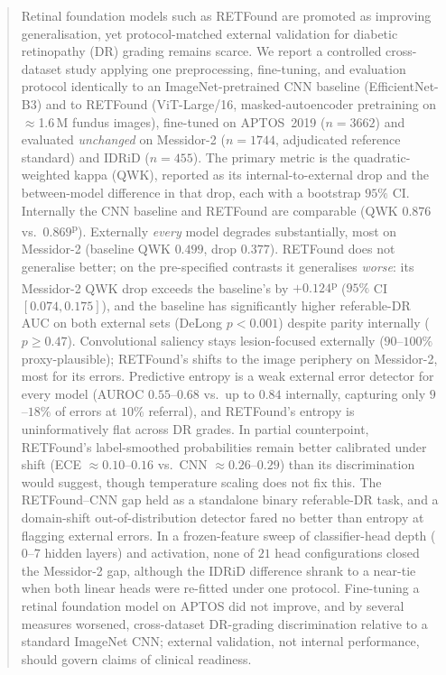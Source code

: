 \documentclass[journal]{IEEEtran}
\newcommand{\pv}[1]{#1\textsuperscript{p}}
\begin{document}
\begin{abstract}
Retinal foundation models such as RETFound are promoted as improving
generalisation, yet protocol-matched external validation for diabetic
retinopathy (DR) grading remains scarce. We report a controlled cross-dataset
study applying one preprocessing, fine-tuning, and evaluation protocol
identically to an ImageNet-pretrained CNN baseline (EfficientNet-B3) and to
RETFound (ViT-Large/16, masked-autoencoder pretraining on $\approx$1.6\,M
fundus images), fine-tuned on APTOS~2019 ($n=3662$) and evaluated
\emph{unchanged} on Messidor-2 ($n=1744$, adjudicated reference standard) and
IDRiD ($n=455$). The primary metric is the quadratic-weighted kappa (QWK),
reported as its internal-to-external drop and the between-model difference in
that drop, each with a bootstrap $95\%$ CI. Internally the CNN baseline and
RETFound are comparable (QWK $0.876$ vs.\ \pv{$0.869$}). Externally
\emph{every} model degrades substantially, most on Messidor-2 (baseline QWK
$0.499$, drop $0.377$). RETFound does not generalise better; on the
pre-specified contrasts it generalises \emph{worse}: its Messidor-2 QWK drop
exceeds the baseline's by \pv{$+0.124$} ($95\%$ CI $[0.074,0.175]$), and the
baseline has significantly higher referable-DR AUC on both external sets
(DeLong $p<0.001$) despite parity internally ($p\geq0.47$). Convolutional
saliency stays lesion-focused externally ($90$--$100\%$ proxy-plausible);
RETFound's shifts to the image periphery on Messidor-2, most for its errors.
Predictive entropy is a weak external error detector for every model (AUROC
$0.55$--$0.68$ vs.\ up to $0.84$ internally, capturing only $9$--$18\%$ of
errors at $10\%$ referral), and RETFound's entropy is uninformatively flat
across DR grades. In partial counterpoint, RETFound's label-smoothed
probabilities remain better calibrated under shift (ECE $\approx0.10$--$0.16$
vs.\ CNN $\approx0.26$--$0.29$) than its discrimination would suggest, though
temperature scaling does not fix this. The RETFound--CNN gap held as a
standalone binary referable-DR task, and a domain-shift out-of-distribution
detector fared no better than entropy at flagging external errors.
In a frozen-feature sweep of classifier-head depth ($0$--$7$ hidden layers) and activation, none of $21$ head configurations closed the Messidor-2 gap, although the IDRiD difference shrank to a near-tie when both linear heads were re-fitted under one protocol.
Fine-tuning a retinal foundation model on APTOS did not improve, and by
several measures worsened, cross-dataset DR-grading discrimination relative
to a standard ImageNet CNN; external validation, not internal performance,
should govern claims of clinical readiness.
\end{abstract}
\end{document}
